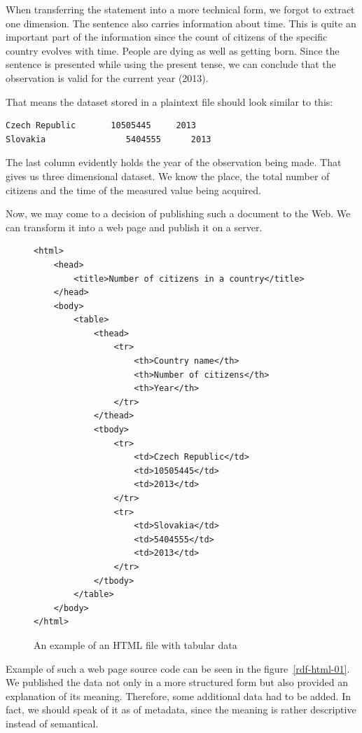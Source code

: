 When transferring the statement into a more technical form, we forgot to extract one
dimension. The sentence also carries information about time. This is quite an important
part of the information since the count of citizens of the specific country evolves with time.
People are dying as well as getting born. Since the sentence is presented while using the
present tense, we can conclude that the observation is valid for the current year (2013).

That means the dataset stored in a plaintext file should look similar to this:

\begin{verbatim}
Czech Republic       10505445     2013
Slovakia	            5404555      2013
\end{verbatim}

The last column evidently holds the year of the observation being made.
That gives us three dimensional dataset. We know the place, the total number of
citizens and the time of the measured value being acquired.

Now, we may come to a decision of publishing such a document to the Web. We can transform
it into a web page and publish it on a server.
\begin{figure}
\small\begin{verbatim}
<html>
    <head>
        <title>Number of citizens in a country</title>
    </head>
    <body>
        <table>
            <thead>
                <tr>
                    <th>Country name</th>
                    <th>Number of citizens</th>
                    <th>Year</th>
                </tr>
            </thead>
            <tbody>
                <tr>
                    <td>Czech Republic</td>
                    <td>10505445</td>
                    <td>2013</td>
                </tr>
                <tr>
                    <td>Slovakia</td>
                    <td>5404555</td>
                    <td>2013</td>
                </tr>
            </tbody>
        </table>
    </body>
</html>
\end{verbatim}\normalsize
\label{fig:rdf-html-01}
\caption{An example of an HTML file with tabular data}
\end{figure}

Example of such a web page source code can be seen in the 
figure~\ref{rdf-html-01}. We published the data not only in a more structured form but also
provided an explanation of its meaning. Therefore, some additional data had to be added. In fact, we
should speak of it as of metadata, since the meaning is rather descriptive instead of semantical.

